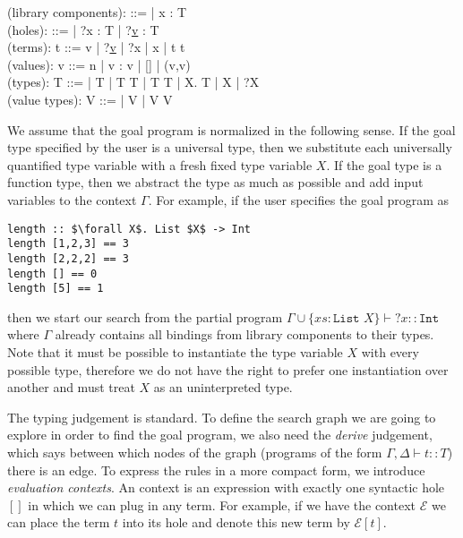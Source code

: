\begin{plstx}
(library components): \Gamma ::= \emptyset | \Gamma \cup x : T \\
(holes): \Delta ::= \emptyset | \Delta \cup ?x : T | \Delta \cup ?\underline{v} : T \\
(terms): t ::= v | ?\underline{v} | ?x | x | t t \\
(values): v ::= n | v : v | [] | (v,v) \\ 
(types): T ::=  |  T |  T T | T \rightarrow T | \forall X. T | X | ?X \\
(value types): V ::=  |  V |  V V \\
\end{plstx}

We assume that the goal program is normalized in the following sense. If the goal type specified by the user is a universal type, then we substitute each universally quantified type variable with a fresh fixed type variable $X$. If the goal type is a function type, then we abstract the type as much as possible and add input variables to the context $\Gamma$.
For example, if the user specifies the goal program as
\begin{lstlisting}[mathescape]
length :: $\forall X$. List $X$ -> Int
length [1,2,3] == 3
length [2,2,2] == 3
length [] == 0
length [5] == 1
\end{lstlisting}
then we start our search from the partial program $\Gamma \cup \{xs : \texttt{List } X \} \vdash ?x :: \texttt{Int}$ where $\Gamma$ already contains all bindings from library components to their types. Note that it must be possible to instantiate the type variable $X$ with every possible type, therefore we do not have the right to prefer one instantiation over another and must treat $X$ as an uninterpreted type.

The typing judgement is standard. To define the search graph we are going to explore in order to find the goal program, we also need the \emph{derive} judgement, which says between which nodes of the graph (programs of the form $\Gamma, \Delta \vdash t :: T$) there is an edge.
To express the rules in a more compact form, we introduce \emph{evaluation contexts}. An context is an expression with exactly one syntactic hole $[]$ in which we can plug in any term. For example, if we have the context $\mathcal{E}$ we can place the term $t$ into its hole and denote this new term by $\mathcal{E}[t]$.

